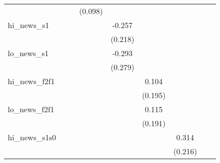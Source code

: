 {\begin{tabular}{l*{8}{c}}
            &                     &                     &     (0.098)         &                     &                     &                     &                     &                     \\
\addlinespace
hi\_news\_s1  &                     &                     &                     &      -0.257         &                     &                     &                     &                     \\
            &                     &                     &                     &     (0.218)         &                     &                     &                     &                     \\
\addlinespace
lo\_news\_s1  &                     &                     &                     &      -0.293         &                     &                     &                     &                     \\
            &                     &                     &                     &     (0.279)         &                     &                     &                     &                     \\
\addlinespace
hi\_news\_f2f1&                     &                     &                     &                     &       0.104         &                     &                     &                     \\
            &                     &                     &                     &                     &     (0.195)         &                     &                     &                     \\
\addlinespace
lo\_news\_f2f1&                     &                     &                     &                     &       0.115         &                     &                     &                     \\
            &                     &                     &                     &                     &     (0.191)         &                     &                     &                     \\
\addlinespace
hi\_news\_s1s0&                     &                     &                     &                     &                     &       0.314         &                     &                     \\
            &                     &                     &                     &                     &                     &     (0.216)         &                     &                     \\

\end{tabular}}
